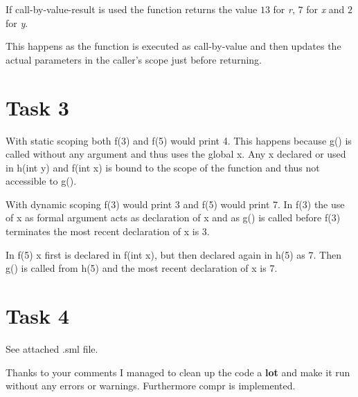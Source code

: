 \documentclass[11pt,a4paper]{article}
\theoremstyle{plain}
\theoremstyle{definition}
\theoremstyle{remark}
\numberwithin{equation}{section}
\begin{document}
If call-by-value-result is used the function returns the value $13$ for \textit{r}, $7$ for \textit{x} and $2$ for \textit{y}. 

This happens as the function is executed as call-by-value and then updates the actual parameters in the caller's scope just before returning.

\section*{Task 3}
With static scoping both f(3) and f(5) would print 4. This happens because g() is called without any argument and thus uses the global x.
Any x declared or used in h(int y) and f(int x) is bound to the scope of the function and thus not accessible to g().

With dynamic scoping f(3) would print 3 and f(5) would print 7. In f(3) the use of x as formal argument acts as declaration of x and as g() is called before f(3) terminates the most recent declaration of x is 3.

In f(5) x first is declared in f(int x), but then declared again in h(5) as 7. Then g() is called from h(5) and the most recent declaration of x is 7.


\section*{Task 4}
See attached .sml file.

Thanks to your comments I managed to clean up the code a \textbf{lot} and make it run without any errors or warnings. Furthermore compr is implemented.
\end{document}
